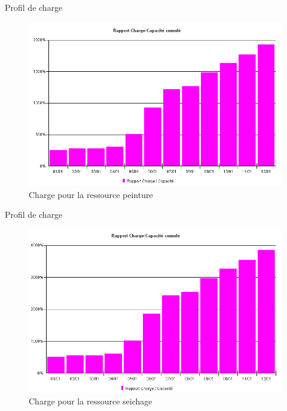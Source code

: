 \begin{frame}{Profil de charge}
\begin{figure}[H]
\centering
\includegraphics[scale=0.4]{../Organisationnelle/captures/charge_pein.PNG}
\caption{Charge pour la ressource peinture}
\end{figure}
\end{frame}


\begin{frame}{Profil de charge}
\begin{figure}[H]
\centering
\includegraphics[scale=0.4]{../Organisationnelle/captures/charge_sei.PNG}
\caption{Charge pour la ressource seichage}
\end{figure}
\end{frame}
	
